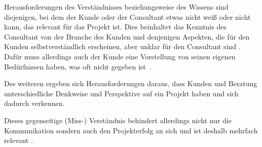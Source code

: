 \documentclass[../main.tex]{subfiles}
\begin{document}
Herausforderungen des Verständnisses beziehungsweise des Wissens sind diejenigen, bei dem der Kunde oder der Consultant etwas nicht weiß oder nicht kann, das relevant für das Projekt ist.
Dies beinhaltet das Kenntnis des Consultant von der Branche des Kunden und denjenigen Aspekten, die für den Kunden selbstverständlich erscheinen, aber unklar für den Consultant sind \autocite{appelbaum2005critical, gamil2017identification, davis2006communication, sutter2019consultants}.
Dafür muss allerdings auch der Kunde eine Vorstellung von seinen eigenen Bedürfnissen haben, was oft nicht gegeben ist \autocite{davis2006communication}.

Des weiteren ergeben sich Herausforderungen daraus, dass Kunden und Beratung unterschiedliche Denkweise und Perspektive auf ein Projekt haben und sich dadurch verkennen.

Dieses gegenseitige (Miss-) Verständnis behindert allerdings nicht nur die Kommunikation sondern auch den Projekterfolg an sich und ist deshalb mehrfach relevant \autocite{appelbaum2005critical}.
\end{document}
